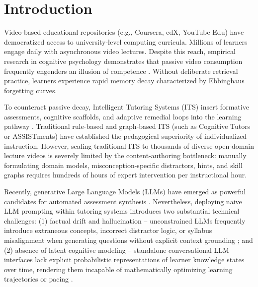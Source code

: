\documentclass[pdflatex,sn-apa]{sn-jnl}
\begin{document}

\maketitle

\section{Introduction}\label{sec1}

Video-based educational repositories (e.g., Coursera, edX, YouTube Edu) have democratized access to university-level computing curricula. Millions of learners engage daily with asynchronous video lectures. Despite this reach, empirical research in cognitive psychology demonstrates that passive video consumption frequently engenders an illusion of competence \citep{dunlosky2013improving,karpicke2008critical}. Without deliberate retrieval practice, learners experience rapid memory decay characterized by Ebbinghaus forgetting curves.

To counteract passive decay, Intelligent Tutoring Systems (ITS) insert formative assessments, cognitive scaffolds, and adaptive remedial loops into the learning pathway \citep{koedinger1997intelligent,bloom19842,vanlehn2006behavior}. Traditional rule-based and graph-based ITS (such as Cognitive Tutors or ASSISTments) have established the pedagogical superiority of individualized instruction. However, scaling traditional ITS to thousands of diverse open-domain lecture videos is severely limited by the content-authoring bottleneck: manually formulating domain models, misconception-specific distractors, hints, and skill graphs requires hundreds of hours of expert intervention per instructional hour.

Recently, generative Large Language Models (LLMs) have emerged as powerful candidates for automated assessment synthesis \citep{scarlatos2024distractor,dan2023educhat,pardos2023chatgpt}. Nevertheless, deploying naive LLM prompting within tutoring systems introduces two substantial technical challenges: (1) factual drift and hallucination -- unconstrained LLMs frequently introduce extraneous concepts, incorrect distractor logic, or syllabus misalignment when generating questions without explicit context grounding \citep{gao2023retrieval,niu2024reducing}; and (2) absence of latent cognitive modeling -- standalone conversational LLM interfaces lack explicit probabilistic representations of learner knowledge states over time, rendering them incapable of mathematically optimizing learning trajectories or pacing \citep{piech2015deep,pelanek2017bayesian,doroudi2019where}.
\end{document}

